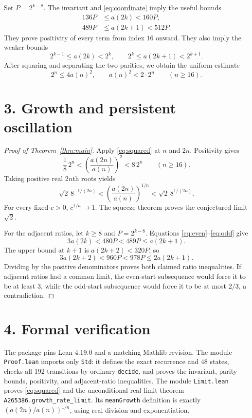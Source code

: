 \documentclass[11pt]{article}
\begin{document}
Set $P=2^{k-8}$. The invariant and \eqref{eq:coordinate} imply the useful bounds
\begin{align}
 136P&\le a(2k)<160P,\label{eq:even}\\
 489P&\le a(2k+1)<512P.\label{eq:odd}
\end{align}
They prove positivity of every term from index $16$ onward. They also imply the weaker bounds
\[
 2^{k-1}\le a(2k)<2^k,
 \qquad 2^k\le a(2k+1)<2^{k+1}.
\]
After squaring and separating the two parities, we obtain the uniform estimate
\begin{equation}\label{eq:squared}
 \boxed{2^n\le4a(n)^2,\qquad a(n)^2<2\cdot2^n\qquad(n\ge16).}
\end{equation}

\newpage
\section*{3. Growth and persistent oscillation}
\begin{proof}[Proof of Theorem~\ref{thm:main}]
Apply \eqref{eq:squared} at $n$ and $2n$. Positivity gives
\[
 \frac18\,2^n
 <\left(\frac{a(2n)}{a(n)}\right)^2
 <8\,2^n\qquad(n\ge16).
\]
Taking positive real $2n$th roots yields
\[
 \sqrt2\,8^{-1/(2n)}
 <\left(\frac{a(2n)}{a(n)}\right)^{1/n}
 <\sqrt2\,8^{1/(2n)}.
\]
For every fixed $c>0$, $c^{1/n}\to1$. The squeeze theorem proves the conjectured limit $\sqrt2$.

For the adjacent ratios, let $k\ge8$ and $P=2^{k-8}$. Equations \eqref{eq:even}--\eqref{eq:odd} give
\[
 3a(2k)<480P<489P\le a(2k+1).
\]
The upper bound at $k+1$ is $a(2k+2)<320P$, so
\[
 3a(2k+2)<960P<978P\le2a(2k+1).
\]
Dividing by the positive denominators proves both claimed ratio inequalities. If adjacent ratios had a common limit, the even-start subsequence would force it to be at least $3$, while the odd-start subsequence would force it to be at most $2/3$, a contradiction.
\end{proof}

\section*{4. Formal verification}
The package pins Lean 4.19.0 and a matching Mathlib revision. The module \texttt{Proof.lean} imports only \texttt{Std}: it defines the exact recurrence and 48 states, checks all 192 transitions by ordinary \texttt{decide}, and proves the invariant, parity bounds, positivity, and adjacent-ratio inequalities. The module \texttt{Limit.lean} proves \eqref{eq:squared} and the unconditional real limit theorem \texttt{A265386.growth\_rate\_limit}. Its \texttt{meanGrowth} definition is exactly $(a(2n)/a(n))^{1/n}$, using real division and exponentiation.
\end{document}
